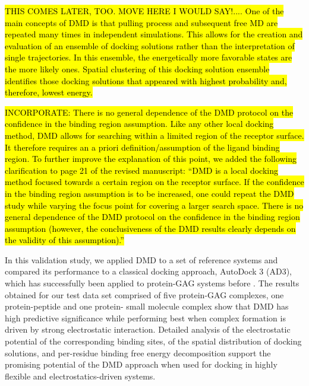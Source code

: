 \hl{THIS COMES LATER, TOO. MOVE HERE I WOULD SAY!.... One of the
main concepts of DMD is that pulling process and subsequent free MD are repeated
many times in independent simulations. This allows for the creation and
evaluation of an ensemble of docking solutions rather than the interpretation of
single trajectories. In this ensemble, the energetically more favorable states
are the more likely ones. Spatial clustering of this docking solution ensemble
identifies those docking solutions that appeared with highest probability and,
therefore, lowest energy.}

\hl{INCORPORATE: There is no general dependence of
the DMD protocol on the confidence in the binding region assumption. Like any
other local docking method, DMD allows for searching within a limited region of
the receptor surface. It therefore requires an a priori definition/assumption of
the ligand binding region. To further improve the explanation of this point, we
added the following clarification to page 21 of the revised manuscript: “DMD is
a local docking method focused towards a certain region on the receptor surface.
If the confidence in the binding region assumption is to be increased, one could
repeat the DMD study while varying the focus point for covering a larger search
space. There is no general dependence of the DMD protocol on the confidence in
the binding region assumption (however, the conclusiveness of the DMD results
clearly depends on the validity of this assumption).” }


In this validation study, we applied DMD to a set of reference systems and
compared its performance to a classical docking approach, AutoDock 3 (AD3),
which has successfully been applied to protein-GAG systems before
\cite{japan_docking_ad3_clustering, samsonov_docking_2011,%
pichert_characterization_2012}. The results obtained for our test data set
comprised of five protein-GAG complexes, one protein-peptide and one protein-
small molecule complex show that DMD has high predictive significance while
performing best when complex formation is driven by strong electrostatic
interaction. Detailed analysis of the electrostatic potential of the
corresponding binding sites, of the spatial distribution of docking solutions,
and per-residue binding free energy decomposition support the promising
potential of the DMD approach when used for docking in highly flexible and
electrostatics-driven systems.

